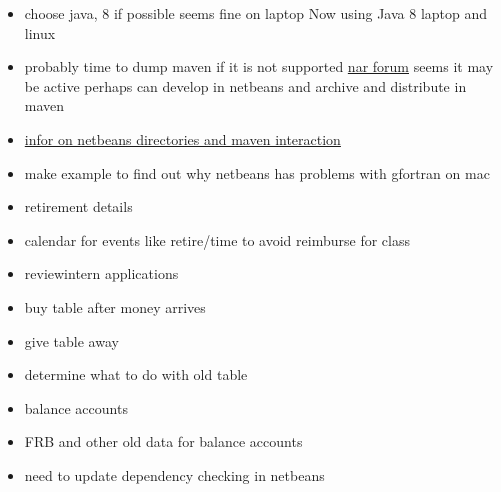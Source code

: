 \documentclass[hyperref]{labbook}
\begin{document}
\begin{itemize}
\item choose java, 8 if possible  seems fine on laptop  Now using Java 8 laptop and linux
\item probably time to dump maven if it is not supported
\href{https://groups.google.com/forum/?fromgroups#!forum/maven-nar}{nar forum} seems it may be active  perhaps can develop in netbeans and archive and distribute in maven
\item \href{https://groups.google.com/d/msg/maven-nar/5feXpvN-Qh0/Sg3hAWgpwAcJ}{infor on netbeans directories and maven interaction}
\item make example to find out why netbeans has problems with gfortran on mac
\end{itemize}


\begin{itemize}
\item retirement details
\item calendar for events like retire/time to avoid reimburse for class
\item reviewintern applications
\item buy table after money arrives
\item give table away 
\item determine what to do with old table
\item balance accounts
\item FRB and other old data for balance accounts
\item need to update dependency checking in netbeans
\end{itemize}
\end{document}
